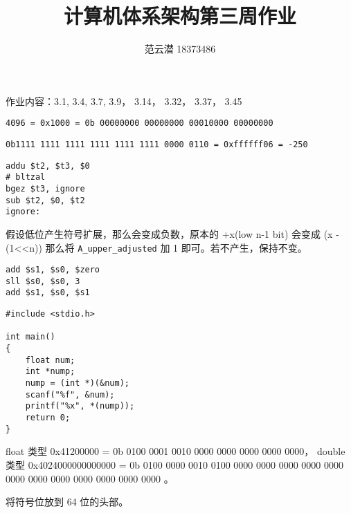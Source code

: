 \documentclass[lang=cn,11pt,a4paper,cite=authoryear]{elegantpaper}
\title{计算机体系架构\quad 第三周作业}
\author{范云潜 18373486}
\institute{微电子学院 184111 班}
\date{\zhtoday}
\begin{document}
\maketitle

作业内容：3.1, 3.4, 3.7, 3.9， 3.14， 3.32， 3.37， 3.45



\lstinline{4096 = 0x1000 = 0b 00000000 00000000 00010000 00000000 }


\lstinline{0b1111 1111 1111 1111 1111 1111 0000 0110 = 0xffffff06 = -250}


\begin{lstlisting}
addu $t2, $t3, $0
# bltzal 
bgez $t3, ignore
sub $t2, $0, $t2
ignore:
\end{lstlisting}


假设低位产生符号扩展，那么会变成负数，原本的 +x(low n-1 bit) 会变成 (x - (1<<n)) 那么将 \lstinline{A_upper_adjusted} 加 1 即可。若不产生，保持不变。


\begin{lstlisting}
add $s1, $s0, $zero
sll $s0, $s0, 3
add $s1, $s0, $s1
\end{lstlisting}



\begin{lstlisting}
#include <stdio.h>

int main()
{
    float num;
    int *nump;
    nump = (int *)(&num);
    scanf("%f", &num);
    printf("%x", *(nump));
    return 0;
}
\end{lstlisting}


float 类型 0x41200000 = 0b 0100 0001 0010 0000 0000 0000 0000 0000， double 类型 0x4024000000000000 = 0b 0100 0000 0010  0100 0000 0000 0000 0000 0000 0000 0000 0000 0000 0000 0000 0000 。




将符号位放到 64 位的头部。

\end{document}
